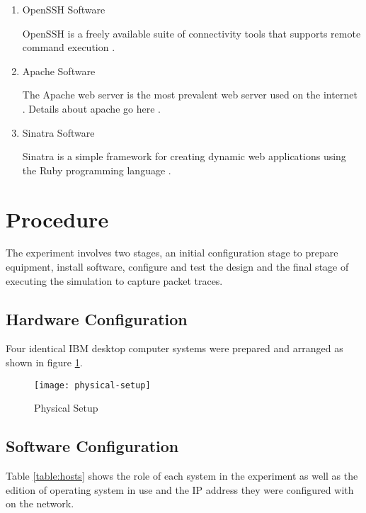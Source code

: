 \begin{enumerate}
  \item OpenSSH Software

  OpenSSH is a freely available suite of connectivity tools
  \parencite{:2010zr,:ve} that supports remote command execution
  \parencite{Tucker:2010ly, :2010zr}.

  \item Apache Software

  The Apache web server is the most prevalent web server used on the internet
  \parencite{2010:dq}. Details about apache go here \parencite{:qf}.

  \item Sinatra Software

  Sinatra is a simple framework for creating dynamic web applications using the
  Ruby programming language \parencite{:2010bh}.

\end{enumerate}

\section{Procedure}

The experiment involves two stages, an initial configuration stage to prepare
equipment, install software, configure and test the design and the final stage
of executing the simulation to capture packet traces.

\subsection{Hardware Configuration}

Four identical IBM desktop computer systems were prepared and arranged as shown
in figure \ref{physical-setup}.

\begin{figure}[H]
  \centering\texttt{[image: physical-setup]}
  \caption{Physical Setup}
  \label{physical-setup}
\end{figure}

\subsection{Software Configuration}

Table \ref{table:hosts} shows the role of each system in the experiment as well
as the edition of operating system in use and the IP address they were
configured with on the network.

